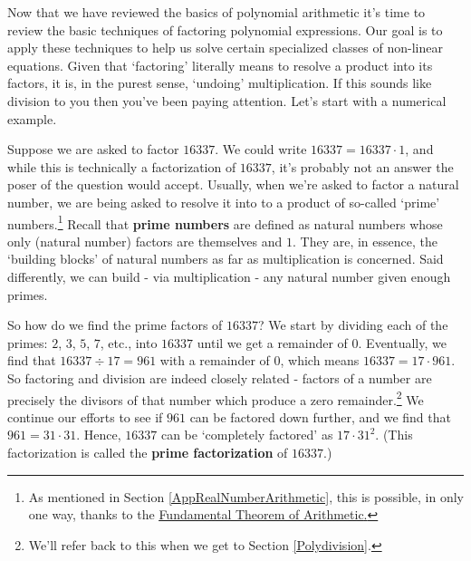

\setcounter{footnote}{0}

\label{AppFactoring}

Now that we have reviewed the basics of polynomial arithmetic it's time to review the basic techniques of factoring polynomial expressions.  Our goal is to apply these techniques to help us solve certain specialized classes of non-linear equations.  Given that `factoring' literally means to resolve a product into its factors, it is, in the purest sense, `undoing' multiplication.  If this sounds like division to you then you've been paying attention.  Let's start with a numerical example.  

\medskip

Suppose we are asked to factor $16337$.  We could write $16337 = 16337 \cdot 1$, and while this is technically a factorization of $16337$,  it's probably not an answer the poser of the question would accept.  Usually, when we're asked to factor a natural number, we are being asked to resolve it into to a product of so-called 	`prime' numbers.\footnote{As mentioned in Section \ref{AppRealNumberArithmetic}, this is possible, in only one way, thanks to the \href{https://en.wikipedia.org/wiki/Fundamental_theorem_of_arithmetic}{\underline{Fundamental Theorem of Arithmetic}.}}  Recall that \textbf{prime numbers} are defined as natural numbers whose only (natural number) factors are themselves and $1$. They are, in essence, the `building blocks' of natural numbers as far as multiplication is concerned.  Said differently, we can build - via multiplication - any natural number given enough primes.  

\medskip

So how do we find the prime factors of $16337$?  We start by dividing each of the primes: $2$, $3$, $5$, $7$, etc., into $16337$ until we get a remainder of $0$.  Eventually, we find that $16337 \div 17 = 961$ with a remainder of $0$, which means $16337 = 17 \cdot 961$.  So factoring and division are indeed closely related - factors of a number are precisely the divisors of that number which produce a zero remainder.\footnote{We'll refer back to this when we get to Section \ref{Polydivision}.}  We continue our efforts to see if $961$ can be factored down further, and we find that $961 = 31 \cdot 31$.  Hence, $16337$ can be `completely factored' as $17 \cdot 31^2$.  (This factorization is called the \textbf{prime factorization} of $16337$.)  

